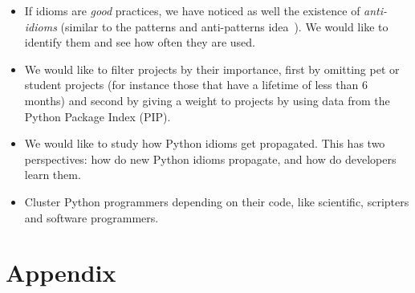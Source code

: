 \documentclass[a4paper]{article}
\begin{document}
\begin{itemize}
  
  \item If idioms are \emph{good} practices, we have noticed as well the existence of \emph{anti-idioms} (similar to the patterns and anti-patterns idea~\cite{brown1998antipatterns}). We would like to identify them and see how often they are used.
  
  \item We would like to filter projects by their importance, first by omitting pet or student projects (for instance those that have a lifetime of less than 6 months) and second by giving a weight to projects by using data from the Python Package Index (PIP).
  
  \item We would like to study how Python idioms get propagated. This has two perspectives: how do new Python idioms propagate, and how do developers learn them.
  
  \item Cluster Python programmers depending on their code, like scientific, scripters and software programmers.

\end{itemize}

 





\section{Appendix}
\appendix
\end{document}

